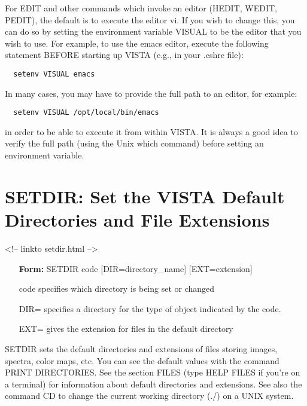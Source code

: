 For EDIT and other commands which invoke an editor (HEDIT, WEDIT, PEDIT),
the default is to execute the editor vi. If you wish to change this, you
can do so by setting the environment variable VISUAL to be the editor that
you wish to use. For example, to use the emacs editor, execute the
following statement BEFORE starting up VISTA (e.g., in your .cshrc file):
\begin{verbatim} 
  setenv VISUAL emacs
\end{verbatim}
In many cases, you may have to provide the full path to an editor, for
example:
\begin{verbatim} 
  setenv VISUAL /opt/local/bin/emacs
\end{verbatim}
in order to be able to execute it from within VISTA.  It is always a good
idea to verify the full path (using the Unix which command) before setting
an environment variable.

\section{SETDIR: Set the VISTA Default Directories and File Extensions}
\begin{rawhtml}
<!-- linkto setdir.html -->
\end{rawhtml}
\begin{itemize}
  \item[\textbf{Form: } SETDIR code {[DIR=directory\_name]} 
       {[EXT=extension]}\hfill]{}
  \item[code]{specifies which directory is being set or changed}
  \item[DIR= ]{   specifies a directory for the type of object
       indicated by the code.}
  \item[EXT=]{gives the extension for files in the default directory}
\end{itemize}

SETDIR sets the default directories and extensions of files storing images,
spectra, color maps, etc.  You can see the default values with the command
PRINT DIRECTORIES.  See the section FILES (type HELP FILES if you're on a
terminal) for information about default directories and extensions.  See
also the command CD to change the current working directory (./) on a UNIX
system.

